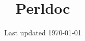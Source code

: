 
\title{Perldoc}
\date{Last updated \today}

\makeindex




\clearpage
{}
\hypertarget{toc}{}
\label{toc}
\tableofcontents
\nc{\pagenumtoc}{\thepage}
\clearpage

